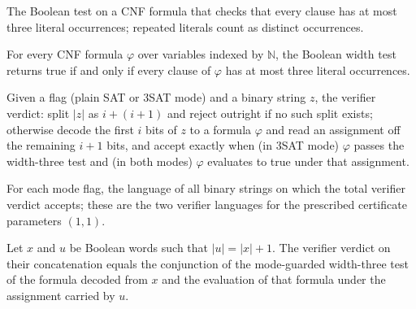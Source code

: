 \begin{definition}
\label{Complexity.satWidth}
\leanok
The Boolean test on a CNF formula that checks that every clause has at most three
literal occurrences; repeated literals count as distinct occurrences.
\end{definition}

\begin{lemma}
\label{Complexity.satWidth_spec}
\leanok
{}
For every CNF formula $\varphi$ over variables indexed by $\mathbb{N}$, the Boolean
width test returns true if and only if every clause of $\varphi$ has at most three
literal occurrences.
\end{lemma}

\begin{definition}
\label{Complexity.satVerdict}
\leanok
{}
Given a flag (plain SAT or 3SAT mode) and a binary string $z$, the verifier verdict:
split $|z|$ as $i + (i+1)$ and reject outright if no such split exists; otherwise
decode the first $i$ bits of $z$ to a formula $\varphi$ and read an assignment off
the remaining $i + 1$ bits, and accept exactly when (in 3SAT mode) $\varphi$ passes
the width-three test and (in both modes) $\varphi$ evaluates to true under that
assignment.
\end{definition}

\begin{definition}
\label{Complexity.satVerifier}
\leanok
{}
For each mode flag, the language of all binary strings on which the total verifier
verdict accepts; these are the two verifier languages for the prescribed
certificate parameters $(1,1)$.
\end{definition}

\begin{lemma}
\label{Complexity.satVerdict_append}
\leanok
{}
Let $x$ and $u$ be Boolean words such that $|u|=|x|+1$. The verifier verdict on their
concatenation equals the conjunction of the mode-guarded width-three test of the formula
decoded from $x$ and the evaluation of that formula under the assignment carried by $u$.
\end{lemma}

